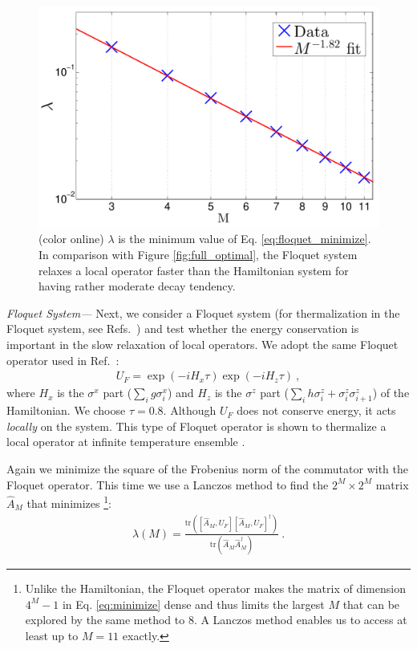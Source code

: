 \documentclass[twocolumn,superscriptaddress, prb]{revtex4-1}
\begin{document}
\begin{figure}
\includegraphics[width=1.0\linewidth]{semi_infinite_floquet_only.pdf}
\centering
\caption{(color online) $\lambda$ is the minimum value of Eq. \eqref{eq:floquet_minimize}. In comparison with Figure \ref{fig:full_optimal}, the Floquet system relaxes a local operator faster than the Hamiltonian system for having rather moderate decay tendency.
}
\label{fig:floquet}
\end{figure}

{\it Floquet System---}
Next, we consider a Floquet system (for thermalization in the Floquet system, see Refs.~) and test whether the energy conservation is important in the slow relaxation of local operators.
We adopt the same Floquet operator used in Ref.~:
\begin{align}
U_F = \exp(-i H_x \tau) \exp(-i H_z \tau) ~,
\end{align}
where $H_x$ is the $\sigma^x$ part ($\sum_i g \sigma^x_i$) and $H_z$ is the $\sigma^z$ part ($\sum_i h \sigma^z_i +\sigma^z_i \sigma^z_{i+1}$)
of the Hamiltonian. We choose $\tau = 0.8$.
Although $U_F$ does not conserve energy, it acts {\it locally} on the system.
This type of Floquet operator is shown to thermalize a local operator at infinite temperature ensemble \cite{Kim_ETH,Prosen:2002}.

Again we minimize the square of the Frobenius norm of the commutator with the Floquet operator.
This time we use a Lanczos method to find the $2^M \times 2^M$ matrix $\hat{A}_M$ 
that minimizes \footnote{Unlike the Hamiltonian, the Floquet operator makes the matrix of dimension $4^M-1$ in Eq. \eqref{eq:minimize} dense and thus
limits the largest $M$ that can be explored by the same method to 8. A Lanczos method enables us to access at least up to $M = 11$ exactly.}:
\begin{align}\label{eq:floquet_minimize}
\lambda(M) = \frac{\mathrm{tr}([\hat{A}_M,U_F][\hat{A}_M,U_F]^\dag)}{\mathrm{tr}(\hat{A}_M\hat{A}_M^\dag)} ~.
\end{align}
 
\end{document}
